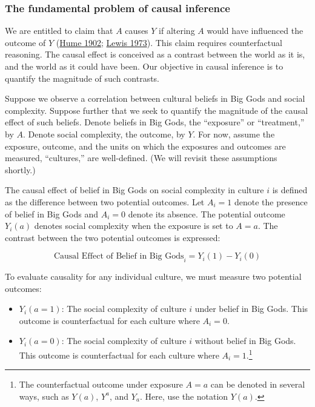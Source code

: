 \documentclass[
  singlecolumn]{article}
\providecommand{\tightlist}{%
  \setlength{\itemsep}{0pt}\setlength{\parskip}{0pt}}\usepackage{longtable,booktabs,array}
\begin{document}
\hypertarget{the-fundamental-problem-of-causal-inference}{%
\subsubsection{The fundamental problem of causal
inference}\label{the-fundamental-problem-of-causal-inference}}

We are entitled to claim that \(A\) causes \(Y\) if altering \(A\) would
have influenced the outcome of \(Y\)
(\protect\hyperlink{ref-hume1902}{Hume 1902};
\protect\hyperlink{ref-lewis1973}{Lewis 1973}). This claim requires
counterfactual reasoning. The causal effect is conceived as a contrast
between the world as it is, and the world as it could have been. Our
objective in causal inference is to quantify the magnitude of such
contrasts.

Suppose we observe a correlation between cultural beliefs in Big Gods
and social complexity. Suppose further that we seek to quantify the
magnitude of the causal effect of such beliefs. Denote beliefs in Big
Gods, the ``exposure'' or ``treatment,'' by \(A\). Denote social
complexity, the outcome, by \(Y\). For now, assume the exposure,
outcome, and the units on which the exposures and outcomes are measured,
``cultures,'' are well-defined. (We will revisit these assumptions
shortly.)

The causal effect of belief in Big Gods on social complexity in culture
\(i\) is defined as the difference between two potential outcomes. Let
\(A_i = 1\) denote the presence of belief in Big Gods and \(A_i = 0\)
denote its absence. The potential outcome \(Y_i(a)\) denotes social
complexity when the exposure is set to \(A = a\). The contrast between
the two potential outcomes is expressed:

\[
\text{Causal Effect of Belief in Big Gods}_i = Y_i(1) - Y_i(0) 
\]

To evaluate causality for any individual culture, we must measure two
potential outcomes:

\begin{itemize}
\tightlist
\item
  \(Y_i(a = 1)\): The social complexity of culture \(i\) under belief in
  Big Gods. This outcome is counterfactual for each culture where
  \(A_i = 0\).
\item
  \(Y_i(a = 0)\): The social complexity of culture \(i\) without belief
  in Big Gods. This outcome is counterfactual for each culture where
  \(A_i = 1\).\footnote{The counterfactual outcome under exposure
    \(A = a\) can be denoted in several ways, such as \(Y(a)\),
    \(Y^{a}\), and \(Y_a\). Here, use the notation \(Y(a)\).}
\end{itemize}
\end{document}
